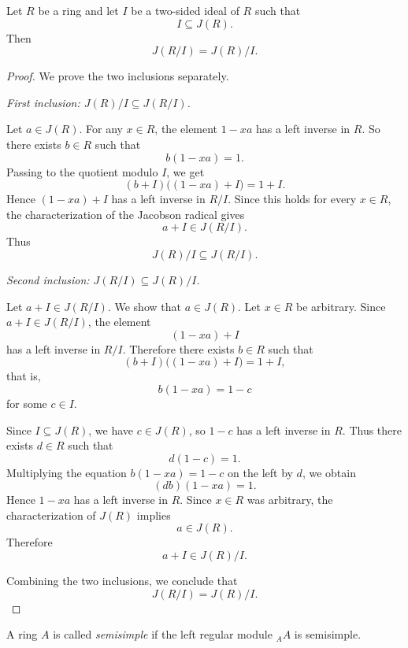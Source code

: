\begin{theorem}
    Let $R$ be a ring and let $I$ be a two-sided ideal of $R$ such that
    \[
        I\subseteq J(R).
    \]
    Then
    \[
        J(R/I)=J(R)/I.
    \]
\end{theorem}

\begin{proof}
    We prove the two inclusions separately.

    \medskip

    \noindent\emph{First inclusion: $J(R)/I\subseteq J(R/I)$.}

    Let $a\in J(R)$. For any $x\in R$, the element $1-xa$ has a left inverse in $R$.
    So there exists $b\in R$ such that
    \[
        b(1-xa)=1.
    \]
    Passing to the quotient modulo $I$, we get
    \[
        (b+I)\bigl((1-xa)+I\bigr)=1+I.
    \]
    Hence $(1-xa)+I$ has a left inverse in $R/I$. Since this holds for every $x\in R$,
    the characterization of the Jacobson radical gives
    \[
        a+I\in J(R/I).
    \]
    Thus
    \[
        J(R)/I\subseteq J(R/I).
    \]

    \medskip

    \noindent\emph{Second inclusion: $J(R/I)\subseteq J(R)/I$.}

    Let $a+I\in J(R/I)$. We show that $a\in J(R)$. Let $x\in R$ be arbitrary.
    Since $a+I\in J(R/I)$, the element
    \[
        (1-xa)+I
    \]
    has a left inverse in $R/I$. Therefore there exists $b\in R$ such that
    \[
        (b+I)\bigl((1-xa)+I\bigr)=1+I,
    \]
    that is,
    \[
        b(1-xa)=1-c
    \]
    for some $c\in I$.

    Since $I\subseteq J(R)$, we have $c\in J(R)$, so $1-c$ has a left inverse in $R$.
    Thus there exists $d\in R$ such that
    \[
        d(1-c)=1.
    \]
    Multiplying the equation $b(1-xa)=1-c$ on the left by $d$, we obtain
    \[
        (db)(1-xa)=1.
    \]
    Hence $1-xa$ has a left inverse in $R$. Since $x\in R$ was arbitrary, the characterization
    of $J(R)$ implies
    \[
        a\in J(R).
    \]
    Therefore
    \[
        a+I\in J(R)/I.
    \]

    Combining the two inclusions, we conclude that
    \[
        J(R/I)=J(R)/I.
    \]
\end{proof}

\begin{definition}
    A ring $A$ is called \emph{semisimple} if the left regular module ${}_AA$ is semisimple.
\end{definition}

